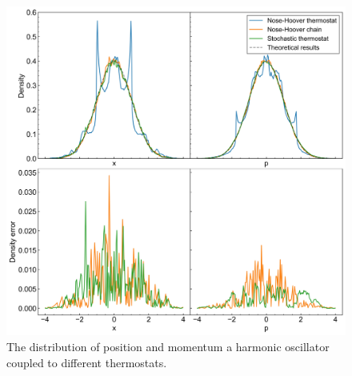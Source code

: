 \documentclass{article}
\begin{document}
\begin{figure}
    \centering
    \includegraphics[width=\textwidth]{compare.jpg}
    \caption{The distribution of position and momentum a harmonic oscillator coupled to different thermostats.}
\end{figure}
\end{document}

